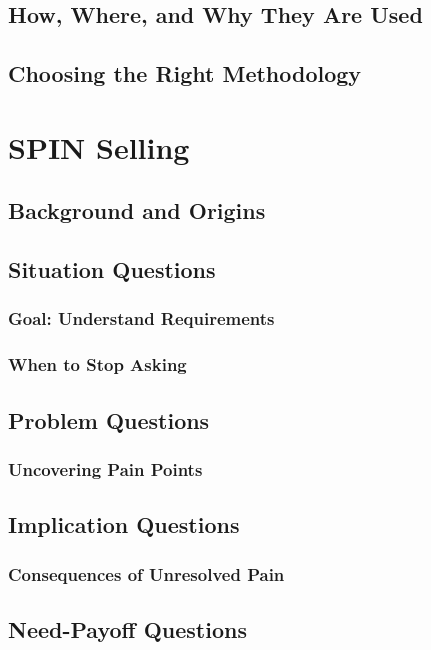     \subsection{How, Where, and Why They Are Used}\mbox{}
    \subsection{Choosing the Right Methodology}\mbox{}

\section{SPIN Selling}\mbox{}
    \subsection{Background and Origins}\mbox{}
    \subsection{Situation Questions}\mbox{}
        \subsubsection{Goal: Understand Requirements}\mbox{}
        \subsubsection{When to Stop Asking}\mbox{}
    \subsection{Problem Questions}\mbox{}
        \subsubsection{Uncovering Pain Points}\mbox{}
    \subsection{Implication Questions}\mbox{}
        \subsubsection{Consequences of Unresolved Pain}\mbox{}
    \subsection{Need-Payoff Questions}\mbox{}

